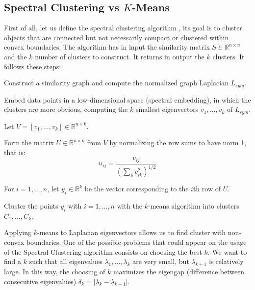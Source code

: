 \subsection{Spectral Clustering vs $K$-Means}
First of all, let us define the spectral clustering algorithm \cite{spectral_algorithm}, its goal is to cluster objects that are connected but not necessarily compact or clustered within convex boundaries. The algorithm has in input the similarity matrix $S \in \mathbb{ R }^{n \times n}$ and the $k$ number of clusters to construct. It returns in output the $k$ clusters. It follows these steps:
\begin{enumerate}
\end{enumerate}
Applying $k$-means to Laplacian eigenvectors allows us to find cluster with non-convex boundaries.
One of the possible problems that could appear on the usage of the Spectral Clustering algorithm consists on choosing the best $k$. We want to find a $k$ such that all eigenvalues $\lambda_1, \dots, \lambda_k$ are very small, but $\lambda_{k+1}$ is relatively large. In this way, the choosing of $k$ maximizes the eigengap (difference between consecutive eigenvalues) $\delta_k = |\lambda_k - \lambda_{k-1}|$.
\newpage

